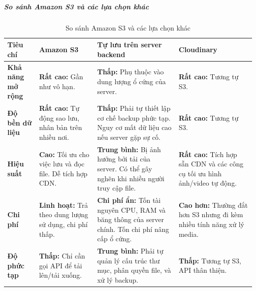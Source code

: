 \subparagraph{So sánh Amazon S3 và các lựa chọn khác}
\clearpage
\begin{landscape}
\begin{table}[h!]
\centering
\setlength{\tabcolsep}{4pt}
\footnotesize
\begin{tabularx}{\linewidth}{|l|X|X|X|}
\hline
\textbf{Tiêu chí} & \textbf{Amazon S3} & \textbf{Tự lưu trên server backend} & \textbf{Cloudinary} \\
\hline
\textbf{Khả năng mở rộng} & \textbf{Rất cao:} Gần như vô hạn. & \textbf{Thấp:} Phụ thuộc vào dung lượng ổ cứng của server. & \textbf{Rất cao:} Tương tự S3. \\
\hline
\textbf{Độ bền dữ liệu} & \textbf{Rất cao:} Tự động sao lưu, nhân bản trên nhiều nơi. & \textbf{Thấp:} Phải tự thiết lập cơ chế backup phức tạp. Nguy cơ mất dữ liệu cao nếu server gặp sự cố. & \textbf{Rất cao:} Tương tự S3. \\
\hline
\textbf{Hiệu suất} & \textbf{Cao:} Tối ưu cho việc lưu và đọc file. Dễ tích hợp CDN. & \textbf{Trung bình:} Bị ảnh hưởng bởi tải của server. Có thể gây nghẽn khi nhiều người truy cập file. & \textbf{Rất cao:} Tích hợp sẵn CDN và các công cụ tối ưu hình ảnh/video tự động. \\
\hline
\textbf{Chi phí} & \textbf{Linh hoạt:} Trả theo dung lượng sử dụng, chi phí thấp. & \textbf{Chi phí ẩn:} Tốn tài nguyên CPU, RAM và băng thông của server chính. Tốn chi phí nâng cấp ổ cứng. & \textbf{Cao hơn:} Thường đắt hơn S3 nhưng đi kèm nhiều tính năng xử lý media. \\
\hline
\textbf{Độ phức tạp} & \textbf{Thấp:} Chỉ cần gọi API để tải lên/tải xuống. & \textbf{Trung bình:} Phải tự quản lý cấu trúc thư mục, phân quyền file, và xử lý backup. & \textbf{Thấp:} Tương tự S3, API thân thiện. \\
\hline
\end{tabularx}
\caption{So sánh Amazon S3 và các lựa chọn khác}
\end{table}
\end{landscape}
